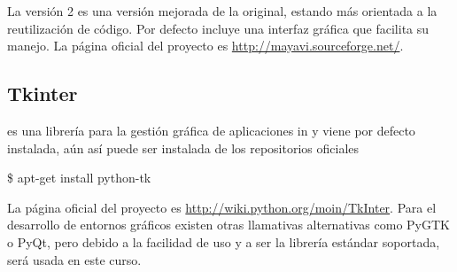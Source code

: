 La versión 2 es una versión mejorada de la original, estando más orientada
a la reutilización de código. Por defecto incluye una interfaz gráfica que
facilita su manejo. La página oficial del proyecto es 
\url{http://mayavi.sourceforge.net/}.






\subsection*{Tkinter}

\tkinter es una librería para la gestión gráfica de aplicaciones in \python 
y viene por defecto instalada, aún así puede ser instalada de los 
repositorios oficiales


\begin{listing}[style=consola, numbers=none]
\$ apt-get install python-tk
\end{listing}


La página oficial del proyecto es \url{http://wiki.python.org/moin/TkInter}.
Para el desarrollo de entornos gráficos existen otras llamativas
alternativas como PyGTK o PyQt, pero debido a la facilidad de uso y a ser
la librería estándar soportada, \tkinter será usada en este curso.




